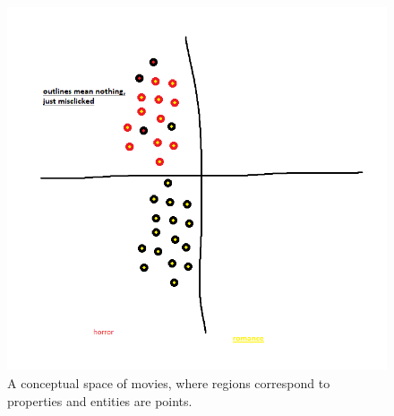 \begin{figure}[t]
	\includegraphics[width=\textwidth]{images/genres_separated.png}
	\centering
	\caption{A conceptual space of movies, where regions correspond to properties and entities are points.}\label{ConceptualSpace}
\end{figure}

